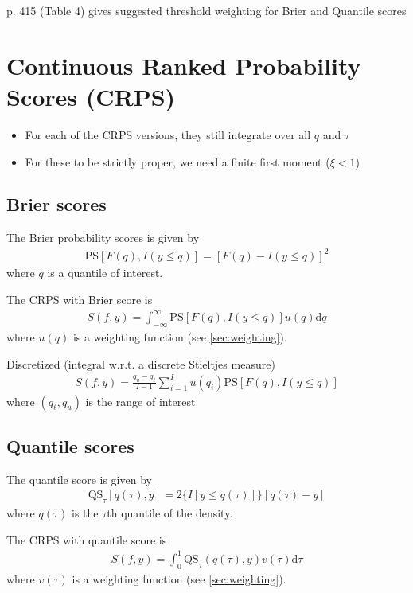 \documentclass[11pt]{article}
\begin{document}
\linenumbers
\citep{Gneiting2011}

p. 415 (Table 4) gives suggested threshold weighting for Brier and Quantile scores

\section{Continuous Ranked Probability Scores (CRPS)}
\begin{itemize}
    \item For each of the CRPS versions, they still integrate over all $q$ and $\tau$
    \item For these to be strictly proper, we need a finite first moment ($\xi < 1$)
\end{itemize}


\subsection{Brier scores}
The Brier probability scores is given by 
\begin{align}
    \text{PS}[ F(q), I(y \le q) ] = [ F(q) - I(y \le q) ]^2
\end{align}
where $q$ is a quantile of interest.

The CRPS with Brier score is
\begin{align}
    S(f, y) = \int_{-\infty}^{\infty} \text{PS}[F(q), I(y \le q) ] u(q) \text{d}q
\end{align}
where $u(q)$ is a weighting function (see \ref{sec:weighting}).

Discretized (integral w.r.t. a discrete Stieltjes measure)
\begin{align}
    S(f, y) = \frac{ q_u - q_\ell }{ I - 1 } \sum_{i = 1}^I u(q_i) \text{PS}[ F(q), I(y \le q) ] 
\end{align}
where $(q_\ell, q_u)$ is the range of interest

\subsection{Quantile scores}
The quantile score is given by
\begin{align}
    \text{QS}_\tau [ q(\tau), y ] = 2 \{ I[y \le q(\tau) ] \} [q(\tau) - y]
\end{align}
where $q(\tau)$ is the $\tau$th quantile of the density.

The CRPS with quantile score is
\begin{align}
    S(f, y) = \int_{0}^{1} \text{QS}_\tau (q(\tau), y) v(\tau) \text{d}\tau
\end{align}
where $v(\tau)$ is a weighting function (see \ref{sec:weighting}).
\end{document}
